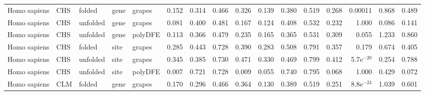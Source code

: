 \begin{longtable}{lllllrrrrrrrrrrr}
        Homo sapiens &                       CHS &    folded &  gene &   grapes &                              0.152 &                               0.314 &                 0.466 &                 0.326 &                              0.139 &                               0.380 &                 0.519 &                 0.268 &       0.00011 &  0.868 &  0.489 \\
        Homo sapiens &                       CHS &  unfolded &  gene &   grapes &                              0.081 &                               0.400 &                 0.481 &                 0.167 &                              0.124 &                               0.408 &                 0.532 &                 0.232 &         1.000 &  0.086 &  0.141 \\
        Homo sapiens &                       CHS &  unfolded &  gene &  polyDFE &                              0.113 &                               0.366 &                 0.479 &                 0.235 &                              0.165 &                               0.365 &                 0.531 &                 0.309 &         0.055 &  1.233 &  0.860 \\
        Homo sapiens &                       CHS &    folded &  site &   grapes &                              0.285 &                               0.443 &                 0.728 &                 0.390 &                              0.283 &                               0.508 &                 0.791 &                 0.357 &         0.179 &  0.674 &  0.405 \\
        Homo sapiens &                       CHS &  unfolded &  site &   grapes &                              0.345 &                               0.385 &                 0.730 &                 0.471 &                              0.330 &                               0.469 &                 0.799 &                 0.412 &  5.7e$^{-20}$ &  0.254 &  0.788 \\
        Homo sapiens &                       CHS &  unfolded &  site &  polyDFE &                              0.007 &                               0.721 &                 0.728 &                 0.009 &                              0.055 &                               0.740 &                 0.795 &                 0.068 &         1.000 &  0.429 &  0.072 \\
        Homo sapiens &                       CLM &    folded &  gene &   grapes &                              0.170 &                               0.296 &                 0.466 &                 0.364 &                              0.130 &                               0.389 &                 0.519 &                 0.251 &  8.8e$^{-24}$ &  1.039 &  0.601 \\

\end{longtable}
